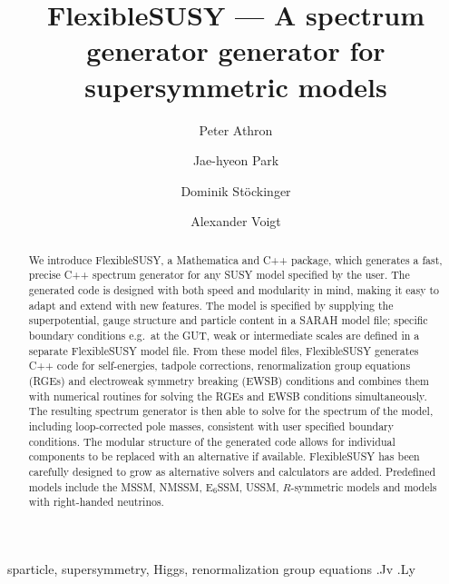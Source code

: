\documentclass[final,3p,11pt,pdflatex]{elsarticle}
\makeatletter
\newcommand{\sarah}{SARAH\@\xspace}
\newcommand{\fs}{FlexibleSUSY\@\xspace}
\newcommand{\mathematica}{Mathematica\xspace}
\newcommand{\ESSM}{E$_6$SSM\@\xspace}
\makeatother
\begin{document}
\begin{frontmatter}
 \title{\Large\bf FlexibleSUSY --- A spectrum generator generator for supersymmetric models}

\author[adelaide]{Peter Athron}
\author[valencia]{Jae-hyeon Park}
\author[dresden]{Dominik St\"ockinger}
\author[desy]{Alexander Voigt}
\address[adelaide]{ARC Centre of Excellence for Particle Physics at 
the Tera-scale, School of Chemistry and Physics, University of Adelaide, 
Adelaide SA 5005 Australia}
\address[valencia]{Departament de F\'{i}sica Te\`{o}rica and IFIC,
Universitat de Val\`{e}ncia-CSIC,
46100, Burjassot, Spain}
\address[dresden]{Institut f\"ur Kern- und Teilchenphysik,
TU Dresden, Zellescher Weg 19, 01069 Dresden, Germany}
\address[desy]{Deutsches Elektronen-Synchrotron (DESY), 22607 Hamburg, Germany}
   
  \begin{abstract}
    We introduce \fs, a \mathematica and C++ package, which generates a fast,
    precise C++ spectrum generator for any SUSY model specified by the
    user.  The generated code is designed with both speed and
    modularity in mind, making it easy to adapt and extend with new
    features. The model is specified by supplying the superpotential,
    gauge structure and particle content in a \sarah model file;
    specific boundary conditions e.g.\ at the GUT, weak or
    intermediate scales are defined in a separate \fs model file.
    From these model files, \fs generates C++ code for self-energies,
    tadpole corrections, renormalization group equations (RGEs) and
    electroweak symmetry breaking (EWSB) conditions and combines them
    with numerical routines for solving the RGEs and EWSB conditions
    simultaneously.  The resulting spectrum generator is then able to
    solve for the spectrum of the model, including loop-corrected pole
    masses, consistent with user specified boundary conditions.  The
    modular structure of the generated code allows for individual
    components to be replaced with an alternative if available. \fs
    has been carefully designed to grow as alternative solvers and
    calculators are added.  Predefined models include the MSSM, NMSSM,
    \ESSM, USSM, $R$-symmetric models and models with right-handed
    neutrinos.
  \end{abstract}

\begin{keyword}
sparticle, 
supersymmetry, 
Higgs,
renormalization group equations
.Jv
.Ly
\end{keyword}
\end{frontmatter}
\end{document}
